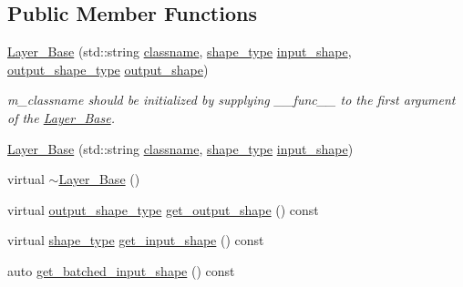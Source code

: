 \subsection*{Public Member Functions}
\begin{DoxyCompactItemize}
\item 
\hyperlink{structbc_1_1nn_1_1Layer__Base_a7f39c80e492c9b0bd4bc5ebbeb629599}{Layer\+\_\+\+Base} (std\+::string \hyperlink{structbc_1_1nn_1_1Layer__Base_a3cae4e4c7061a12bb494886dc809c33b}{classname}, \hyperlink{structbc_1_1nn_1_1Layer__Base_ab8cbdaad20a0270b2555a91676a79932}{shape\+\_\+type} \hyperlink{classbc_1_1nn_1_1Layer__Input__Base_ab7d41ba8f59817a76ceecd13b47f101a}{input\+\_\+shape}, \hyperlink{structbc_1_1nn_1_1Layer__Output__Base_aa627047014ee5dff2b9cc1804c791815}{output\+\_\+shape\+\_\+type} \hyperlink{structbc_1_1nn_1_1Layer__Output__Base_a68e2547ad75da9ef3a3410a9aec85a5e}{output\+\_\+shape})
\begin{DoxyCompactList}\small\item\em m\+\_\+classname should be initialized by supplying {\ttfamily \+\_\+\+\_\+func\+\_\+\+\_\+} to the first argument of the \hyperlink{structbc_1_1nn_1_1Layer__Base}{Layer\+\_\+\+Base}. \end{DoxyCompactList}\item 
\hyperlink{structbc_1_1nn_1_1Layer__Base_ae44170fd034038dcd6246a8726d2e109}{Layer\+\_\+\+Base} (std\+::string \hyperlink{structbc_1_1nn_1_1Layer__Base_a3cae4e4c7061a12bb494886dc809c33b}{classname}, \hyperlink{structbc_1_1nn_1_1Layer__Base_ab8cbdaad20a0270b2555a91676a79932}{shape\+\_\+type} \hyperlink{classbc_1_1nn_1_1Layer__Input__Base_ab7d41ba8f59817a76ceecd13b47f101a}{input\+\_\+shape})
\item 
virtual \hyperlink{structbc_1_1nn_1_1Layer__Base_a619861aa2a749d3eac142713765f1ead}{$\sim$\+Layer\+\_\+\+Base} ()
\item 
virtual \hyperlink{structbc_1_1nn_1_1Layer__Output__Base_aa627047014ee5dff2b9cc1804c791815}{output\+\_\+shape\+\_\+type} \hyperlink{structbc_1_1nn_1_1Layer__Base_aff66487c94bed067367631b29106a6d9}{get\+\_\+output\+\_\+shape} () const
\item 
virtual \hyperlink{structbc_1_1nn_1_1Layer__Base_ab8cbdaad20a0270b2555a91676a79932}{shape\+\_\+type} \hyperlink{structbc_1_1nn_1_1Layer__Base_a11ccc81c1df4b81149e2329e5b5c708a}{get\+\_\+input\+\_\+shape} () const
\item 
auto \hyperlink{structbc_1_1nn_1_1Layer__Base_ae9e5a56e554fe06a071429670f6109dd}{get\+\_\+batched\+\_\+input\+\_\+shape} () const

\end{DoxyCompactItemize}
